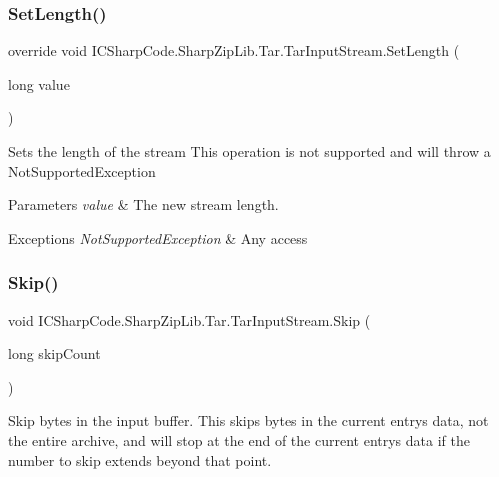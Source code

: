\subsubsection{\texorpdfstring{Set\+Length()}{SetLength()}}
{\footnotesize\ttfamily override void I\+C\+Sharp\+Code.\+Sharp\+Zip\+Lib.\+Tar.\+Tar\+Input\+Stream.\+Set\+Length (\begin{DoxyParamCaption}\item[{long}]{value }\end{DoxyParamCaption})\hspace{0.3cm}{\ttfamily [inline]}}



Sets the length of the stream This operation is not supported and will throw a Not\+Supported\+Exception 


\begin{DoxyParams}{Parameters}
{\em value} & The new stream length.\\
\hline
\end{DoxyParams}

\begin{DoxyExceptions}{Exceptions}
{\em Not\+Supported\+Exception} & Any access\\
\hline
\end{DoxyExceptions}
\mbox{\label{class_i_c_sharp_code_1_1_sharp_zip_lib_1_1_tar_1_1_tar_input_stream_a5655d5d9c6aff286c0efa3cba12db494}} 
\subsubsection{\texorpdfstring{Skip()}{Skip()}}
{\footnotesize\ttfamily void I\+C\+Sharp\+Code.\+Sharp\+Zip\+Lib.\+Tar.\+Tar\+Input\+Stream.\+Skip (\begin{DoxyParamCaption}\item[{long}]{skip\+Count }\end{DoxyParamCaption})\hspace{0.3cm}{\ttfamily [inline]}}



Skip bytes in the input buffer. This skips bytes in the current entry\textquotesingle{}s data, not the entire archive, and will stop at the end of the current entry\textquotesingle{}s data if the number to skip extends beyond that point. 


